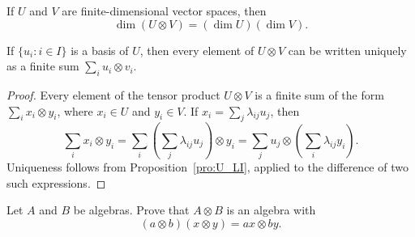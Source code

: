 If $U$ and $V$ are finite-dimensional vector spaces, then 
\[
	\dim(U\otimes V)=(\dim U)(\dim V).
\]

\begin{corollary}
	If $\{u_i:i\in I\}$ is a basis of $U$, then every element of $U\otimes V$
	can be written uniquely as a finite sum $\sum_{i}u_i\otimes v_i$.
\end{corollary}

\begin{proof}
	Every element of the tensor product $U\otimes V$ is a finite sum 
	of the form $\sum_i x_i\otimes y_i$, where $x_i\in U$ and $y_i\in V$. If  
	$x_i=\sum_j\lambda_{ij}u_j$, then 
	\[
		\sum_i x_i\otimes y_i=\sum_i\left(\sum_j\lambda_{ij}u_j\right)\otimes y_i		
		=\sum_j u_j\otimes\left(\sum_i\lambda_{ij}y_i\right).
	\]
	Uniqueness follows from Proposition~\ref{pro:U_LI}, applied
	to the difference of two such expressions.
\end{proof}

%

\begin{exercise}
\label{xca:tensor_algebras}
    Let $A$ and $B$ be algebras. Prove that $A\otimes B$ 
    is an algebra with 
	\[
		(a\otimes b)(x\otimes y)=ax\otimes by.
	\]
\end{exercise}


